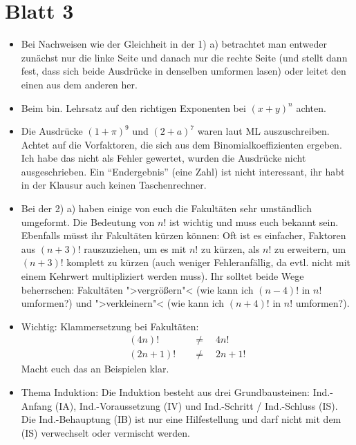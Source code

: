 \documentclass[11pt, a4paper]{article}
\begin{document}
\section*{Blatt 3}
\begin{itemize}
\item Bei Nachweisen wie der Gleichheit in der 1) a) betrachtet man entweder zunächst nur die linke Seite und danach nur die rechte Seite (und stellt dann fest, dass sich beide Ausdrücke in denselben umformen lasen) oder leitet den einen aus dem anderen her.

\item Beim bin. Lehrsatz auf den richtigen Exponenten bei $(x + y)^n$ achten.

\item Die Ausdrücke $(1 + \pi)^9$ und $(2 + a)^7$ waren laut ML auszuschreiben. Achtet auf die Vorfaktoren, die sich aus dem Binomialkoeffizienten ergeben. Ich habe das nicht als Fehler gewertet, wurden die Ausdrücke nicht ausgeschrieben. Ein \enquote{Endergebnis} (eine Zahl) ist nicht interessant, ihr habt in der Klausur auch keinen Taschenrechner.

\item Bei der 2) a) haben einige von euch die Fakultäten sehr umständlich umgeformt. Die Bedeutung von $n!$ ist wichtig und muss euch bekannt sein. Ebenfalls müsst ihr Fakultäten kürzen können: Oft ist es einfacher, Faktoren aus $(n+3)!$ rauszuziehen, um es mit $n!$ zu kürzen, als $n!$ zu erweitern, um $(n+3)!$ komplett zu kürzen (auch weniger Fehleranfällig, da evtl. nicht mit einem Kehrwert multipliziert werden muss). Ihr solltet beide Wege beherrschen: Fakultäten ">vergrößern"< (wie kann ich $(n-4)!$ in $n!$ umformen?) und ">verkleinern"< (wie kann ich $(n+4)!$ in $n!$ umformen?).

\item Wichtig: Klammersetzung bei Fakultäten:
\begin{align*}
(4n)! \quad &\neq \quad 4n!\\
(2n + 1)!\quad &\neq \quad 2n + 1!
\end{align*}
Macht euch das an Beispielen klar.

\item Thema Induktion: Die Induktion besteht aus drei Grundbausteinen: Ind.-Anfang (IA), Ind.-Voraussetzung (IV) und Ind.-Schritt / Ind.-Schluss (IS). Die Ind.-Behauptung (IB) ist nur eine Hilfestellung und darf nicht mit dem (IS) verwechselt oder vermischt werden.


\end{itemize}
\end{document}
